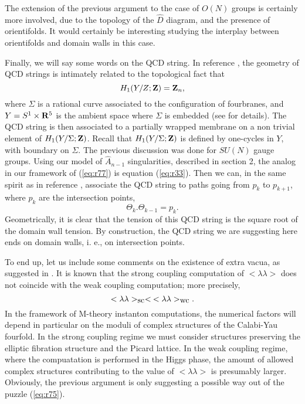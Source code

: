 The extension of the previous argument to the case of $O(N)$
groups is certainly more involved, due to the topology of the
$\hat{D}$ diagram, and the presence of orientifolds. It would
certainly be interesting studying the interplay between
orientifolds and domain walls in this case.
  
Finally, we will say some words on the QCD string. In reference
\cite{Wbqcd}, the geometry of QCD strings is intimately related
to the topological fact that
\begin{equation}
H_1(Y/Z;{\bf Z}) = {\bf Z}_n,
\label{eq:r77}
\end{equation}
where $\Sigma$ is a rational curve associated to the
configuration of fourbranes, and $Y=S^1 \times {\bf R}^5$ is the
ambient space where $\Sigma$ is embedded (see \cite{Wbqcd} for
details). The QCD string is then associated to a partially
wrapped membrane on a non trivial element of $H_1(Y/\Sigma;{\bf
Z})$. Recall that $H_1(Y/\Sigma;{\bf Z})$ is defined by
one-cycles in $Y$, with boundary on $\Sigma$. The previous
discussion was done for $SU(N)$ gauge groups. Using our model of
$\hat{A}_{n-1}$ singularities, described in section 2, the
analog in our framework of (\ref{eq:r77}) is equation
(\ref{eq:r33}). Then we can, in the same spirit as in reference
\cite{Wbqcd}, associate the QCD string to paths going from $p_k$
to $p_{k+1}$, where $p_k$ are the intersection points,
\begin{equation}
\Theta_k . \Theta_{k-1} = p_k.
\label{eq:r78}
\end{equation}
Geometrically, it is clear that the tension of this QCD string is
the square root of the domain wall tension. By construction, the
QCD string we are suggesting here ends on domain walls, i. e., on
intersection points.

To end up, let us include some comments on the existence of
extra vacua, as suggested in \cite{KS}. It is known
that the strong coupling computation of $<\lambda \lambda>$ does
not coincide with the weak coupling computation; more precisely\cite{NSVZ2},
\begin{equation}
<\lambda \lambda>_{\hbox {sc}} < \: <\lambda \lambda>_{\hbox
{wc}}.
\label{eq:r75}
\end{equation}
In the framework of M-theory instanton computations, the
numerical factors will depend in particular on the moduli of
complex structures
of the Calabi-Yau fourfold. In the strong coupling regime we must consider
structures preserving the elliptic fibration structure and the
Picard lattice. In the weak coupling regime, where the
compuatation is performed in the Higgs phase, the amount of
allowed complex structures contributing to the value of $<\lambda
\lambda>$ is presumably larger. Obviously, the previous argument is only
suggesting a possible way out of the puzzle (\ref{eq:r75}).

